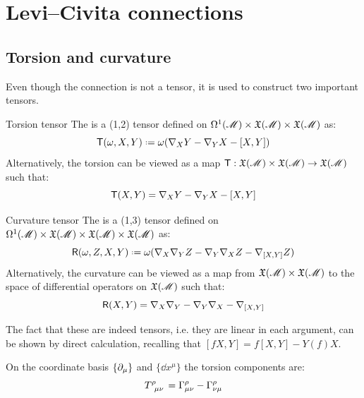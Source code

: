 \section{Levi--Civita connections}


\subsection{Torsion and curvature}

Even though the connection is not a tensor, it is used to construct two important tensors.

\begin{definition}{Torsion tensor}{}
  The  is a (1,2) tensor defined on $ \Omega^{1}(\mathscr{M}) \times \mathfrak{X}(\mathscr{M}) \times \mathfrak{X}(\mathscr{M}) $ as:
  \begin{equation}
    \tors(\omega,X,Y) \defeq \omega (\na_X Y - \na_Y X - [X,Y])
  \end{equation}
  Alternatively, the torsion can be viewed as a map $ \textsf{T} : \mathfrak{X}(\mathscr{M}) \times \mathfrak{X}(\mathscr{M}) \rightarrow \mathfrak{X}(\mathscr{M}) $ such that:
  \begin{equation}
    \textsf{T}(X,Y) = \nabla_X Y - \nabla_Y X - [X,Y]
  \end{equation}
\end{definition}

\begin{definition}{Curvature tensor}{}
  The  is a (1,3) tensor defined on $ \Omega^{1}(\mathscr{M}) \times \mathfrak{X}(\mathscr{M}) \times \mathfrak{X}(\mathscr{M}) \times \mathfrak{X}(\mathscr{M}) $ as:
  \begin{equation}
    \riem(\omega,Z,X,Y) \defeq \omega (\na_X \na_Y Z - \na_Y \na_X Z - \na_{[X,Y]} Z)
    \label{eq:riemann-def}
  \end{equation}
  Alternatively, the curvature can be viewed as a map from $ \mathfrak{X}(\mathscr{M}) \times \mathfrak{X}(\mathscr{M}) $ to the space of differential operators on $ \mathfrak{X}(\mathscr{M}) $ such that:
  \begin{equation}
    \textsf{R}(X,Y) = \nabla_X \nabla_Y - \nabla_Y \nabla_X - \nabla_{[X,Y]}
    \label{eq:riemann-operator-def}
  \end{equation}
\end{definition}

The fact that these are indeed tensors, i.e. they are linear in each argument, can be shown by direct calculation, recalling that $ [fX,Y] = f[X,Y] - Y(f) X $.

\begin{proposition}{}{}
  On the coordinate basis $ \{\partial_\mu\} $ and $ \{\dd x^\mu\} $ the torsion components are:
  \begin{equation}
    \tensor{T}{^\rho _\mu _\nu} = \Gamma^\rho_{\mu \nu} - \Gamma^\rho_{\nu \mu}
    \label{eq:torsion-comp}
  \end{equation}
\end{proposition}

